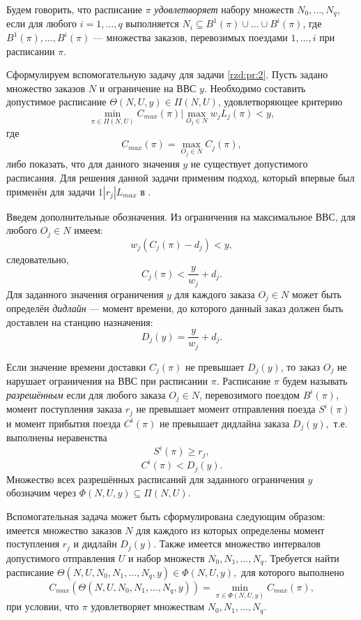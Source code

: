 Будем говорить, что расписание $\pi$ \textit{удовлетворяет} набору множеств $N_0, \dots, N_q$, если для любого $i=1,\dots,q$ выполняется $N_i \subseteq B^1(\pi)\cup \dots \cup B^i(\pi)$, где $B^1(\pi), \dots, B^i(\pi)$ --- множества заказов, перевозимых поездами $1, \dots, i$ при расписании $\pi$.

Сформулируем вспомогательную задачу для задачи \ref{rzd:pr:2}.
Пусть задано множество заказов $N$ и ограничение на ВВС $y$. Необходимо составить допустимое расписание $\Theta(N,U,y) \in \Pi(N,U)$, удовлетворяющее критерию
\begin{equation*}
\min\limits_{\pi \in \Pi(N,U)}C_{max}(\pi) | \max\limits_{O_j\in N} w_j L_j(\pi) < y,
\end{equation*}
где
$$C_{max}(\pi) = \max\limits_{O_j \in N} C_j(\pi),$$
либо показать, что для данного значения $y$ не существует допустимого расписания. Для решения данной задачи применим подход, который впервые был применён для задачи $1|r_j|L_{max}$ в \cite{Laz:08}.

Введем дополнительные обозначения. Из ограничения на максимальное ВВС, для любого $O_j \in N$ имеем:
$$w_j(C_j(\pi) - d_j) < y,$$
следовательно,
$$C_j(\pi) < \frac{y}{w_j} + d_j.$$
Для заданного значения ограничения $y$  для каждого заказа $O_j \in N$ может быть определён \textit{дидлайн} --- момент времени, до которого данный заказ должен быть доставлен на станцию назначения:
$$D_j(y) = \frac{y}{w_j} + d_j.$$

Если значение времени доставки $C_j(\pi)$ не превышает $D_j(y)$, то заказ $O_j$ не нарушает ограничения на ВВС при расписании $\pi$. Расписание $\pi$ будем называть \textit{разрешённым} если для любого заказа $O_j \in N$, перевозимого поездом $B^i(\pi)$, момент поступления заказа $r_j$ не превышает момент отправления поезда $S^i(\pi)$ и момент прибытия поезда $C^i(\pi)$ не превышает дидлайна заказа $D_j(y),$ т.е. выполнены неравенства
$$S^i(\pi) \geq r_j,$$
$$C^i(\pi) < D_j(y).$$
Множество всех разрешённых расписаний для заданного ограничения $y$ обозначим через $\Phi(N,U,y) \subseteq \Pi(N,U)$.

Вспомогательная задача может быть сформулирована следующим образом: имеется множество заказов $N$ для каждого из которых определены момент поступления $r_j$ и дидлайн $D_j(y)$. Также имеется множество интервалов допустимого отправления $U$ и набор множеств $N_0, N_1, \dots, N_q$. Требуется найти расписание $\Theta(N,U,N_0, N_1, \dots, N_q,y) \in \Phi(N,U,y),$ для которого выполнено
\begin{equation}\label{rzd:eq:2}
C_{max}(\Theta(N,U,N_0, N_1, \dots, N_q,y)) = \min\limits_{\pi \in \Phi(N,U,y)} C_{max}(\pi),
\end{equation}
при условии, что $\pi$ удовлетворяет множествам $N_0, N_1, \dots, N_q$.

